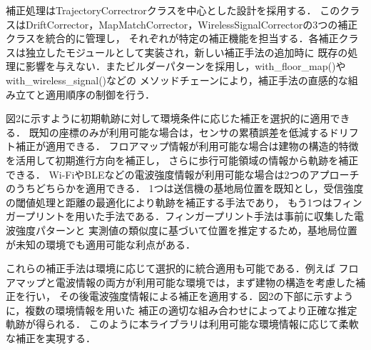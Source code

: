 \documentclass[a4paper, 10pt, twocolumn]{jarticle}
\begin{document}
補正処理はTrajectoryCorrectrorクラスを中心とした設計を採用する．
このクラスはDriftCorrector，MapMatchCorrector，WirelessSignalCorrectorの3つの補正クラスを統合的に管理し，
それぞれが特定の補正機能を担当する．各補正クラスは独立したモジュールとして実装され，新しい補正手法の追加時に
既存の処理に影響を与えない．またビルダーパターンを採用し，with\_floor\_map()やwith\_wireless\_signal()などの
メソッドチェーンにより，補正手法の直感的な組み立てと適用順序の制御を行う．

図2に示すように初期軌跡に対して環境条件に応じた補正を選択的に適用できる．
既知の座標のみが利用可能な場合は，センサの累積誤差を低減するドリフト補正が適用できる．
フロアマップ情報が利用可能な場合は建物の構造的特徴を活用して初期進行方向を補正し，
さらに歩行可能領域の情報から軌跡を補正できる．
Wi-FiやBLEなどの電波強度情報が利用可能な場合は2つのアプローチのうちどちらかを適用できる．
1つは送信機の基地局位置を既知とし，受信強度の閾値処理と距離の最適化により軌跡を補正する手法であり，
もう1つはフィンガープリントを用いた手法である．フィンガープリント手法は事前に収集した電波強度パターンと
実測値の類似度に基づいて位置を推定するため，基地局位置が未知の環境でも適用可能な利点がある．


これらの補正手法は環境に応じて選択的に統合適用も可能である．例えば
フロアマップと電波情報の両方が利用可能な環境では，まず建物の構造を考慮した補正を行い，
その後電波強度情報による補正を適用する．図2の下部に示すように，複数の環境情報を用いた
補正の適切な組み合わせによってより正確な推定軌跡が得られる．
このように本ライブラリは利用可能な環境情報に応じて柔軟な補正を実現する．%
\end{document}
